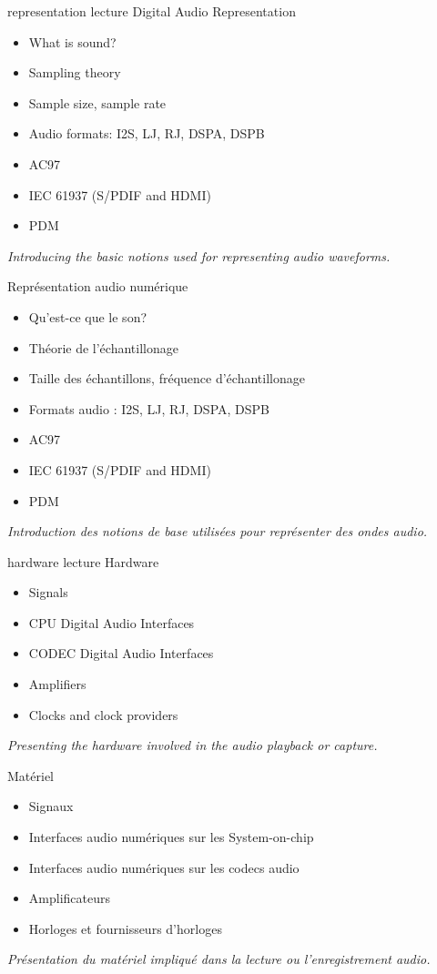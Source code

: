 \def \haslabs{false}

\def \onsitelecturetimeratio{75}
\def \onsitedemotimeratio{25}


{representation}
{lecture}
{Digital Audio Representation}
{
  \begin{itemize}
  \item What is sound?
  \item Sampling theory
  \item Sample size, sample rate
  \item Audio formats: I2S, LJ, RJ, DSPA, DSPB
  \item AC97
  \item IEC 61937 (S/PDIF and HDMI)
  \item PDM
  \end{itemize}
  \vspace{0.5em}
  {\em Introducing the basic notions used for representing audio waveforms.}
}
{Représentation audio numérique}
{
  \begin{itemize}
  \item Qu'est-ce que le son?
  \item Théorie de l'échantillonage
  \item Taille des échantillons, fréquence d'échantillonage
  \item Formats audio : I2S, LJ, RJ, DSPA, DSPB
  \item AC97
  \item IEC 61937 (S/PDIF and HDMI)
  \item PDM
  \end{itemize}
  \vspace{0.5em}
  {\em Introduction des notions de base utilisées pour représenter des ondes audio.}
}
{hardware}
{lecture}
{Hardware}
{
  \begin{itemize}
  \item Signals
  \item CPU Digital Audio Interfaces
  \item CODEC Digital Audio Interfaces
  \item Amplifiers
  \item Clocks and clock providers
  \end{itemize}
  \vspace{0.5em}
  {\em Presenting the hardware involved in the audio playback or capture.}
}
{Matériel}
{
  \begin{itemize}
  \item Signaux
  \item Interfaces audio numériques sur les System-on-chip
  \item Interfaces audio numériques sur les codecs audio
  \item Amplificateurs
  \item Horloges et fournisseurs d'horloges
  \end{itemize}
  \vspace{0.5em}
  {\em Présentation du matériel impliqué dans la lecture ou l'enregistrement audio.}
}
